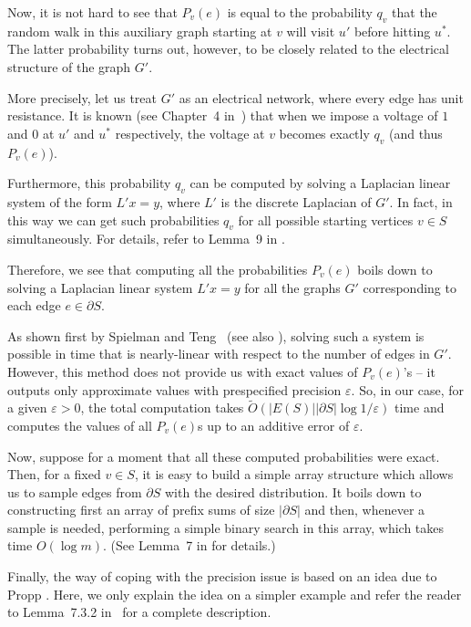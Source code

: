 \documentclass[11pt, letterpaper]{article}
\newcommand{\tO}{\widetilde{O}}
\begin{document}
Now, it is not hard to see that $P_v(e)$ is equal to the probability $q_v$ that the random walk in this auxiliary graph starting at $v$ will visit $u'$ before hitting $u^*$. The latter probability turns out, however, to be closely related to the electrical structure of the graph $G'$. 

More precisely, let us treat $G'$ as an electrical network, where every edge has unit resistance. It is known (see Chapter~4 in~\cite{Lovasz93}) that when we impose a voltage of $1$ and $0$ at $u'$ and $u^*$ respectively, the voltage at $v$ becomes exactly $q_v$ (and thus $P_v(e)$). 

Furthermore, this probability $q_v$ can be computed by solving a Laplacian linear system of the form $L'x=y$, where $L'$ is the discrete Laplacian of $G'$. In fact, in this way we can get such probabilities $q_v$ for all possible starting vertices $v\in S$ simultaneously. For details, refer to Lemma~9 in \cite{KelnerM09}.

Therefore, we see that computing all the probabilities $P_v(e)$ boils down to solving a Laplacian linear system $L'x=y$ for all the graphs $G'$ corresponding to each edge $e\in \partial S$.

As shown first by Spielman and Teng~\cite{SpielmanT04} (see also \cite{KoutisMP10,KoutisMP11,KelnerOSZ13}), solving such a system is possible in time that is nearly-linear with respect to the number of edges in $G'$. However, this method does not provide us with exact values of $P_v(e)$'s -- it outputs only approximate values with prespecified precision $\varepsilon$. So, in our case, for a given $\varepsilon>0$, the total computation takes $\tO(|E(S)||\partial S|\log 1/\varepsilon)$ time and computes the values of all $P_v(e)$s up to an additive error of $\varepsilon$.

Now, suppose for a moment that all these computed probabilities were exact. Then, for a fixed $v\in S$, it is easy to build a simple array structure which allows us to sample edges from $\partial S$ with the desired distribution. It boils down to constructing first an array of prefix sums of size $|\partial S|$ and then, whenever a sample is needed, performing  a simple binary search in this array, which takes time $O(\log m)$. (See Lemma~7 in \cite{KelnerM09} for details.)

Finally, the way of coping with the precision issue is based on an idea due to Propp \cite{Propp10}. Here, we only explain the idea on a simpler example and refer the reader to Lemma~7.3.2 in~\cite{Madry11} for a complete description. 
\end{document}
